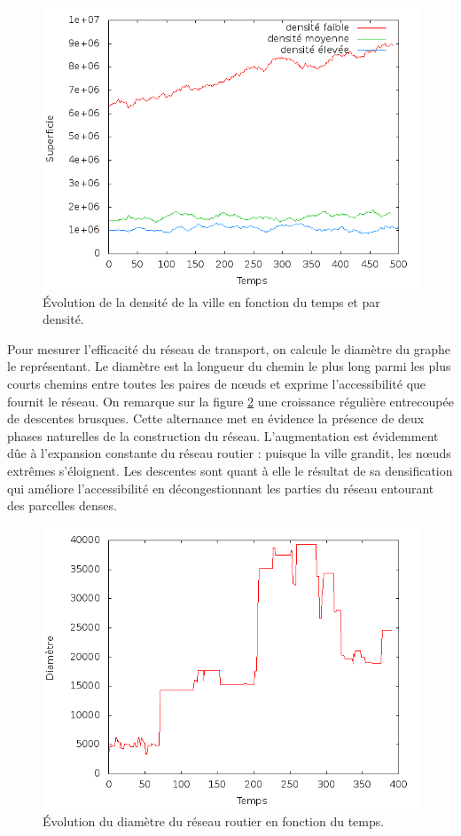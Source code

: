 \documentclass[10pt]{article}
\begin{document}
\begin{figure}[H]
  \centering
  \includegraphics[width=.8\linewidth]{images/area_ALL.png}
  \caption{Évolution de la densité de la ville en fonction du temps et
  par densité.}
  \label{fig:area_density}
\end{figure}

Pour mesurer l'efficacité du réseau de transport, on calcule le
diamètre du graphe le représentant. Le diamètre est la longueur du
chemin le plus long parmi les plus courts chemins entre toutes les
paires de n\oe uds et exprime l'accessibilité que fournit le
réseau. On remarque sur la figure \ref{fig:diameter} une croissance
régulière entrecoupée de descentes brusques. Cette alternance met en
évidence la présence de deux phases naturelles de la construction du
réseau. L'augmentation est évidemment dûe à l'expansion constante du
réseau routier : puisque la ville grandit, les n\oe uds extrêmes
s'éloignent. Les descentes sont quant à elle le résultat de sa
densification qui améliore l'accessibilité en décongestionnant les
parties du réseau entourant des parcelles denses.

\begin{figure}[H]
  \centering
  \includegraphics[width=.8\linewidth]{images/diameter.png}
  \caption{Évolution du diamètre du réseau routier en fonction du temps.}
  \label{fig:diameter}
\end{figure}
\end{document}
